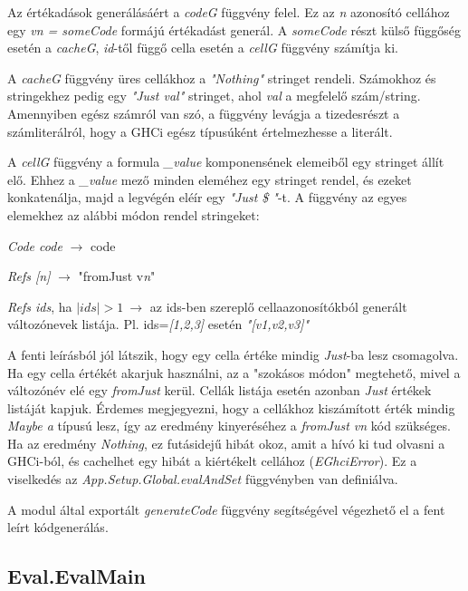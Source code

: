 Az értékadások generálásáért a \textit{codeG} függvény felel. Ez az \textit{n} azonosító cellához egy \textit{vn = someCode} formájú értékadást generál. A \textit{someCode} részt külső függőség esetén a \textit{cacheG}, \textit{id}-től függő cella esetén a \textit{cellG} függvény számítja ki.

A \textit{cacheG} függvény üres cellákhoz a \textit{"Nothing"} stringet rendeli. Számokhoz és stringekhez pedig egy \textit{"Just val"} stringet, ahol \textit{val} a megfelelő szám/string. Amennyiben egész számról van szó, a függvény levágja a tizedesrészt a számliterálról, hogy a GHCi egész típusúként értelmezhesse a literált.

A \textit{cellG} függvény a formula \textit{\_value} komponensének elemeiből egy stringet állít elő. Ehhez a \textit{\_value} mező minden eleméhez egy stringet rendel, és ezeket konkatenálja, majd a legvégén eléír egy \textit{"Just \$ "}-t. A függvény az egyes elemekhez az alábbi módon rendel stringeket:
\begin{compactenum}
	\item \textit{Code code} $\rightarrow$ code
	\item \textit{Refs [n]} $\rightarrow$ "fromJust v\textit{n}"
	\item \textit{Refs ids}, ha $|ids| > 1 \ \rightarrow$ az ids-ben szereplő cellaazonosítókból generált változónevek listája. Pl. ids=\textit{[1,2,3]} esetén \textit{"[v1,v2,v3]"}
\end{compactenum}

A fenti leírásból jól látszik, hogy egy cella értéke mindig \textit{Just}-ba lesz csomagolva. Ha egy cella értékét akarjuk használni, az a "szokásos módon" megtehető, mivel a változónév elé egy \textit{fromJust} kerül. Cellák listája esetén azonban \textit{Just} értékek listáját kapjuk. Érdemes megjegyezni, hogy a cellákhoz kiszámított érték mindig \textit{Maybe a} típusú lesz, így az eredmény kinyeréséhez a \textit{fromJust vn} kód szükséges. Ha az eredmény \textit{Nothing}, ez futásidejű hibát okoz, amit a hívó ki tud olvasni a GHCi-ból, és cachelhet egy hibát a kiértékelt cellához (\textit{EGhciError}). Ez a viselkedés az \textit{App.Setup.Global.evalAndSet} függvényben van definiálva.

A modul által exportált \textit{generateCode} függvény segítségével végezhető el a fent leírt kódgenerálás. 

\subsection{Eval.EvalMain}


